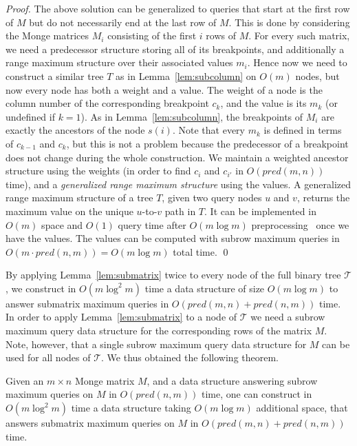 \documentclass{llncs}
\newcommand{\pred}[1]{pred(#1)}
\begin{document}
\begin{proof}
The above solution can be generalized to queries that start at the first row of $M$ but do not necessarily end at the last row of $M$. This is done
by considering the Monge matrices $M_{i}$ consisting
of the first $i$ rows of $M$. For every such matrix, we need a predecessor structure
storing all of its breakpoints, and additionally a range maximum structure over
their associated values $m_i$. Hence now we need to construct a similar
tree $T$ as in Lemma~\ref{lem:subcolumn} on $O(m)$ nodes,
but now every node has both a weight and a value. The weight of a node is the column number
of the corresponding breakpoint $c_{k}$, and the value is its $m_{k}$ (or undefined if $k=1$).
As in Lemma~\ref{lem:subcolumn}, the breakpoints of $M_{i}$ are exactly the ancestors of the node $s(i)$. Note that
every $m_{k}$ is defined in terms of $c_{k-1}$ and $c_{k}$, but this is not a problem because
the predecessor of a breakpoint does not change during the whole construction.
We maintain a weighted ancestor structure
using the weights (in order to find $c_{i}$ and $c_{i'}$ in $O(\pred{m,n})$ time), and a {\em generalized range maximum structure} using the values. A generalized range maximum structure of a tree $T$, given two query nodes $u$ and $v$, returns the maximum value on the unique $u$-to-$v$
path in $T$. It can be implemented
in $O(m)$ space and $O(1)$ query time after $O(m\log m)$ preprocessing~\cite{DemaineLandauWeimann}
once we have the values. The values can be computed with subrow maximum queries
in $O(m \cdot \pred{n,m}) = O(m\log m)$ total time.
\qed \end{proof}

By applying Lemma~\ref{lem:submatrix} twice to every node of the full binary tree $\mathcal T$,
we construct in $O(m\log ^2 m)$ time a data structure of size $O(m\log m)$ to
answer submatrix maximum queries in $O(\pred{m,n}+\pred{n,m})$ time. In
order to apply Lemma~\ref{lem:submatrix} to a node of $\mathcal T$ we
need a subrow maximum query data structure for the corresponding rows
of the matrix $M$. Note, however, that a single subrow maximum query
data structure for $M$ can be used for all nodes of $\mathcal T$. We
thus obtained the following theorem.

\begin{theorem}
\label{thm:submatrix}
Given an $m\times n$ Monge matrix $M$, and a data structure 
answering subrow maximum queries on $M$ in $O(\pred{n,m})$ time, one can
construct in $O(m\log ^2 m)$ time  a data structure
taking $O(m \log m)$
additional space, that answers submatrix maximum queries on $M$ in $O(\pred{m,n}+\pred{n,m})$ time.
\end{theorem}
\end{document}
